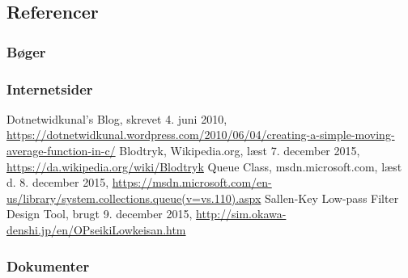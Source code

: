 \begin{thebibliography}{99}
\section{Referencer}
\subsubsection{Bøger}
\subsubsection{Internetsider}
Dotnetwidkunal's Blog, skrevet 4. juni 2010,
\url{https://dotnetwidkunal.wordpress.com/2010/06/04/creating-a-simple-moving-average-function-in-c/}
Blodtryk, Wikipedia.org, læst 7. december 2015, \url{https://da.wikipedia.org/wiki/Blodtryk}
Queue Class, msdn.microsoft.com, læst d. 8. december 2015, \url{https://msdn.microsoft.com/en-us/library/system.collections.queue(v=vs.110).aspx}
Sallen-Key Low-pass Filter Design Tool, brugt 9. december 2015, \url{http://sim.okawa-denshi.jp/en/OPseikiLowkeisan.htm}
\subsubsection{Dokumenter}

\end{thebibliography}